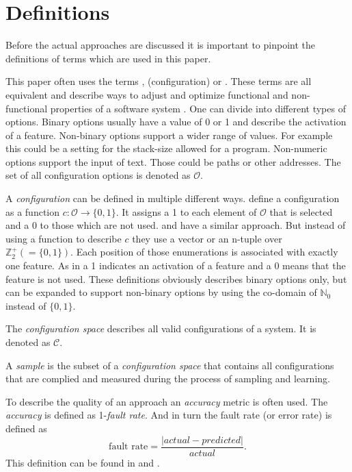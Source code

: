 \section{Definitions}

Before the actual approaches are discussed it is important to pinpoint the definitions of terms which are used in this paper.

This paper often uses the terms , (configuration)  or . These terms are all equivalent and describe ways to adjust and optimize functional and non-functional properties of a software system \cite{DistanceBasedSampling2019}.
One can divide into different types of options. Binary options usually have a value of 0 or 1 and describe the activation of a feature. Non-binary options support a wider range of values. For example this could be a setting for the stack-size allowed for a program. Non-numeric options support the input of text. Those could be paths or other addresses.
The set of all configuration options is denoted as $\mathcal{O}$.

A \textit{configuration} can be defined in multiple different ways. \citet{DistanceBasedSampling2019} define a configuration as a function $c : \mathcal{O} \rightarrow \{0,1\}$. It assigns a 1 to each element of $\mathcal{O}$ that is selected and a 0 to those which are not used. \citet{VariabilityAwarePerformancePredictionJianmeiSigmundApel} and
\citet{FasterDiscoveryofFasterSystemConfigurationsSiegmund2017} have a similar approach. But instead of using a function to describe $c$ they use a vector or an n-tuple over $\mathbb{Z}^+_2(= \{0,1\})$. Each position of those enumerations is associated with exactly one feature. As in \citet{DistanceBasedSampling2019} a 1 indicates an activation of a feature and a 0 means that the feature is not used. These definitions obviously describes binary options only, but can be expanded to support non-binary options by using the co-domain of $\mathbb{N}_0$ instead of $\{0,1\}$.

The \textit{configuration space} describes all valid configurations of a system. It is denoted as $\mathcal{C}$.

A \textit{sample} is the subset of a \textit{configuration space} that contains all configurations that are complied and measured during the process of sampling and learning.

To describe the quality of an approach an \textit{accuracy} metric is often used. The \textit{accuracy} is defined as 1-\textit{fault rate}. And in turn the fault rate (or error rate) is defined as 
\begin{equation}
	\text{fault rate}= \frac{|actual-predicted|}{actual}.
\end{equation} This definition can be found in \cite{FasterDiscoveryofFasterSystemConfigurationsSiegmund2017} and \cite{AutomatedFeatureDetectionSiegmund2012}.
